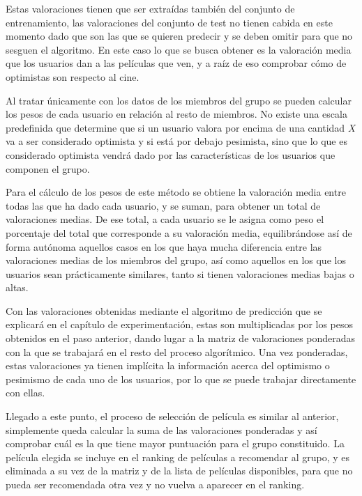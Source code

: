 Estas valoraciones tienen que ser extraídas también del conjunto de entrenamiento, las valoraciones del conjunto de test no tienen cabida en este momento dado que son las que se quieren predecir y se deben omitir para que no sesguen el algoritmo. En este caso lo que se busca obtener es la valoración media que los usuarios dan a las películas que ven, y a raíz de eso comprobar cómo de optimistas son respecto al cine.

Al tratar únicamente con los datos de los miembros del grupo se pueden calcular los pesos de cada usuario en relación al resto de miembros. No existe una escala predefinida que determine que si un usuario valora por encima de una cantidad \textit{X} va a ser considerado optimista y si está por debajo pesimista, sino que lo que es considerado optimista vendrá dado por las características de los usuarios que componen el grupo.

Para el cálculo de los pesos de este método se obtiene la valoración media entre todas las que ha dado cada usuario, y se suman, para obtener un total de valoraciones medias. De ese total, a cada usuario se le asigna como peso el porcentaje del total que corresponde a su valoración media, equilibrándose así de forma autónoma aquellos casos en los que haya mucha diferencia entre las valoraciones medias de los miembros del grupo, así como aquellos en los que los usuarios sean prácticamente similares, tanto si tienen valoraciones medias bajas o altas.

Con las valoraciones obtenidas mediante el algoritmo de predicción que se explicará en el capítulo de experimentación, estas son multiplicadas por los pesos obtenidos en el paso anterior, dando lugar a la matriz de valoraciones ponderadas con la que se trabajará en el resto del proceso algorítmico. Una vez ponderadas, estas valoraciones ya tienen implícita la información acerca del optimismo o pesimismo de cada uno de los usuarios, por lo que se puede trabajar directamente con ellas.

Llegado a este punto, el proceso de selección de película es similar al anterior, simplemente queda calcular la suma de las valoraciones ponderadas y así comprobar cuál es la que tiene mayor puntuación para el grupo constituido. La película elegida se incluye en el ranking de películas a recomendar al grupo, y es eliminada a su vez de la matriz y de la lista de películas disponibles, para que no pueda ser recomendada otra vez y no vuelva a aparecer en el ranking.

